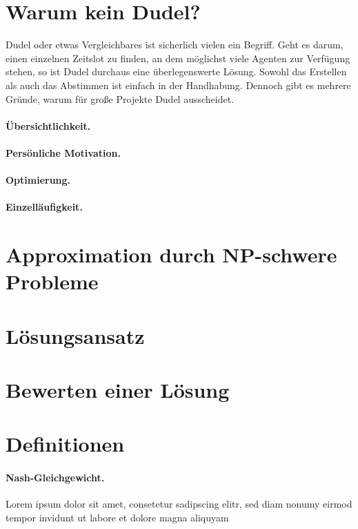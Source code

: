\documentclass[12pt,twoside]{article}
\theoremstyle{plain}
\theoremstyle{definition}
\theoremstyle{remark}
\begin{document}
\section{Warum kein Dudel?}
\label{sec:dudel}
Dudel oder etwas Vergleichbares ist sicherlich vielen ein Begriff.
Geht es darum, einen einzelnen Zeitslot zu finden, an dem möglichst viele Agenten zur Verfügung stehen, so ist Dudel durchaus eine überlegenswerte Lösung.
Sowohl das Erstellen als auch das Abstimmen ist einfach in der Handhabung.
Dennoch gibt es mehrere Gründe, warum für große Projekte Dudel ausscheidet.
\paragraph{Übersichtlichkeit.}
\paragraph{Persönliche Motivation.}
\paragraph{Optimierung.}
\paragraph{Einzelläufigkeit.}

\lipsum[6]
\lipsum[51]

\section{Approximation durch NP-schwere Probleme}
\label{sec:approx}
\lipsum[7-27]
\lipsum[52-55]

\section{Lösungsansatz}
\label{sec:sol}
\lipsum[28-39]

\section{Bewerten einer Lösung}
\label{sec:eval}
\lipsum[40-50]

\newpage
{}
\section*{Definitionen}
\paragraph*{Nash-Gleichgewicht.}
	\label{def:nash}
	Lorem ipsum dolor sit amet, consetetur sadipscing elitr, sed diam nonumy eirmod tempor invidunt ut labore et dolore magna aliquyam
\end{document}
